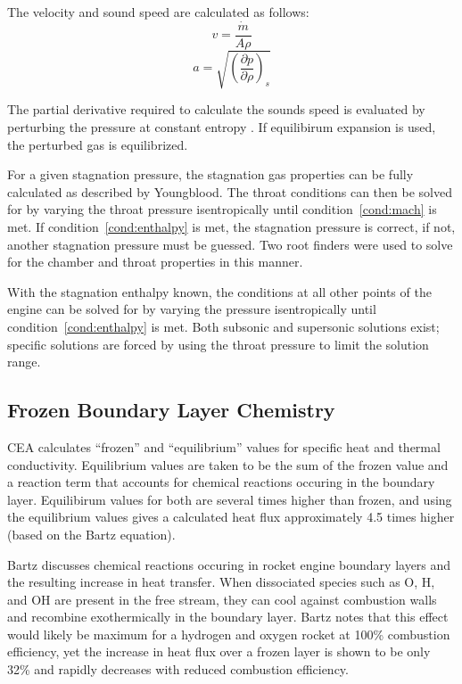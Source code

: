 \documentclass[11pt]{article}
\begin{document}
The velocity and sound speed are calculated as follows:
\begin{equation}
  v = \frac{\dot{m}}{A \rho}
\end{equation}%
\begin{equation}
  a = \sqrt{\left(\frac{\partial p}{\partial \rho}\right)_s}
\end{equation}

The partial derivative required to calculate the sounds speed is evaluated by perturbing the pressure at constant entropy \cite{}. If equilibirum expansion is used, the perturbed gas is equilibrized.

For a given stagnation pressure, the stagnation gas properties can be fully calculated as described by Youngblood. The throat conditions can then be solved for by varying the throat pressure isentropically until condition~\ref{cond:mach} is met. If condition~\ref{cond:enthalpy} is met, the stagnation pressure is correct, if not, another stagnation pressure must be guessed. Two root finders were used to solve for the chamber and throat properties in this manner.

With the stagnation enthalpy known, the conditions at all other points of the engine can be solved for by varying the pressure isentropically until condition~\ref{cond:enthalpy} is met. Both subsonic and supersonic solutions exist; specific solutions are forced by using the throat pressure to limit the solution range.


\subsection{Frozen Boundary Layer Chemistry}

CEA calculates ``frozen'' and ``equilibrium'' values for specific heat and thermal conductivity. Equilibrium values are taken to be the sum of the frozen value and a reaction term that accounts for chemical reactions occuring in the boundary layer. Equilibirum values for both are several times higher than frozen, and using the equilibrium values gives a calculated heat flux approximately 4.5 times higher (based on the Bartz equation).

Bartz \cite{page 46} discusses chemical reactions occuring in rocket engine boundary layers and the resulting increase in heat transfer. When dissociated species such as O, H, and OH are present in the free stream, they can cool against combustion walls and recombine exothermically in the boundary layer. Bartz notes that this effect would likely be maximum for a hydrogen and oxygen rocket at 100\% combustion efficiency, yet the increase in heat flux over a frozen layer is shown to be only 32\% and rapidly decreases with reduced combustion efficiency.
\end{document}

